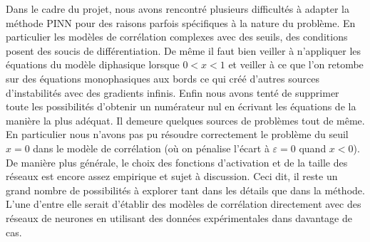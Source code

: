 Dans le cadre du projet, nous avons rencontré plusieurs difficultés à adapter la méthode PINN pour des raisons parfois spécifiques à la nature du problème. En particulier les modèles de corrélation complexes avec des seuils, des conditions posent des soucis de différentiation. De même il faut bien veiller à n'appliquer les équations du modèle diphasique lorsque $0<x<1$ et veiller à ce que l'on retombe sur des équations monophasiques aux bords ce qui créé d'autres sources d'instabilités avec des gradients infinis. Enfin nous avons tenté de supprimer toute les possibilités d'obtenir un numérateur nul en écrivant les équations de la manière la plus adéquat. Il demeure quelques sources de problèmes tout de même. En particulier nous n'avons pas pu résoudre correctement le problème du seuil $x=0$ dans le modèle de corrélation (où on pénalise l'écart à $\varepsilon = 0$ quand $x<0$).\\

De manière plus générale, le choix des fonctions d'activation et de la taille des réseaux est encore assez empirique et sujet à discussion. Ceci dit, il reste un grand nombre de possibilités à explorer tant dans les détails que dans la méthode. L'une d'entre elle serait d'établir des modèles de corrélation directement avec des réseaux de neurones en utilisant des données expérimentales dans davantage de cas.

